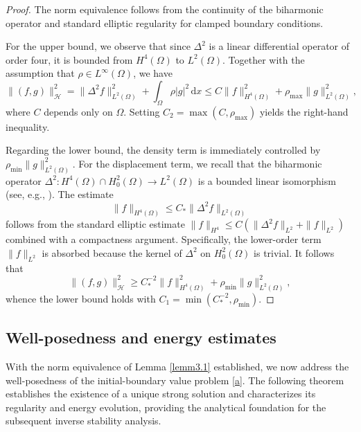 \documentclass[12pt,reqno]{amsart}
\numberwithin{equation}{section}
\begin{document}
	\begin{proof}
		The norm equivalence follows from the continuity of the biharmonic operator and standard elliptic regularity for clamped boundary conditions. 
		
		For the upper bound, we observe that since $\Delta^2$ is a linear differential operator of order four, it is bounded from $H^4(\Omega)$ to $L^2(\Omega)$. Together with the assumption that $\rho \in L^\infty(\Omega)$, we have
		\begin{equation*}
			\|(f, g)\|_{\mathcal{H}}^2 = \|\Delta^2 f\|_{L^2(\Omega)}^2 + \int_\Omega \rho |g|^2 \, \mathrm{d}x \le C \|f\|_{H^4(\Omega)}^2 + \rho_{\max} \|g\|_{L^2(\Omega)}^2,
		\end{equation*}
		where $C$ depends only on $\Omega$. Setting $C_2 = \max(C, \rho_{\max})$ yields the right-hand inequality.
		
		Regarding the lower bound, the density term is immediately controlled by $\rho_{\min} \|g\|_{L^2(\Omega)}^2$. For the displacement term, we recall that the biharmonic operator $\Delta^2 : H^4(\Omega) \cap H_0^2(\Omega) \to L^2(\Omega)$ is a bounded linear isomorphism (see, e.g., \cite{Gazzola2010Polyharmonic}). The estimate 
		\begin{equation}\label{eq:elliptic_coercivity}
			\|f\|_{H^4(\Omega)} \le C_* \|\Delta^2 f\|_{L^2(\Omega)}
		\end{equation}
		follows from the standard elliptic estimate $\|f\|_{H^4} \le C(\|\Delta^2 f\|_{L^2} + \|f\|_{L^2})$ combined with a compactness argument. Specifically, the lower-order term $\|f\|_{L^2}$ is absorbed because the kernel of $\Delta^2$ on $H_0^2(\Omega)$ is trivial. It follows that 
		\begin{equation*}
			\|(f, g)\|_{\mathcal{H}}^2 \ge C_*^{-2} \|f\|_{H^4(\Omega)}^2 + \rho_{\min} \|g\|_{L^2(\Omega)}^2,
		\end{equation*}
		whence the lower bound holds with $C_1 = \min(C_*^{-2}, \rho_{\min})$.
	\end{proof}
	
	\subsection{ Well-posedness and energy estimates}
	
	With the norm equivalence of Lemma \ref{lemm3.1} established, we now address the well-posedness of the initial-boundary value problem \eqref{a}. The following theorem establishes the existence of a unique strong solution and characterizes its regularity and energy evolution, providing the analytical foundation for the subsequent inverse stability analysis.
	
\end{document}
